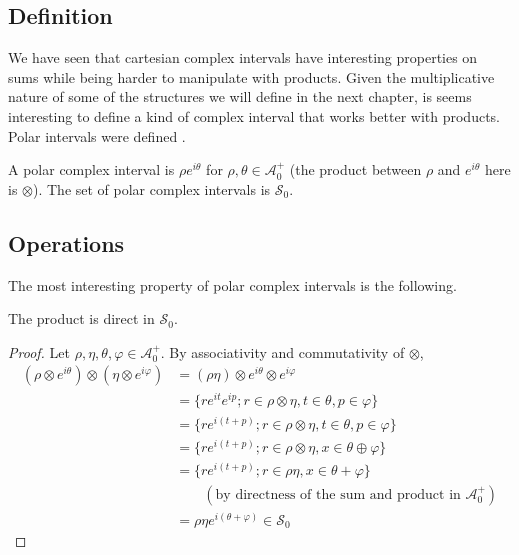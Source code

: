 \subsection{Definition}

We have seen that cartesian complex intervals have interesting properties on sums while being harder to manipulate with products. Given the multiplicative nature of some of the structures we will define in the next chapter, is seems interesting to define a kind of complex interval that works better with products. Polar intervals were defined .

A polar complex interval is $\rho e^{i\theta}$ for $\rho, \theta \in \mathcal{A}_0^+$ (the product between $\rho$ and $e^{i\theta}$ here is $\otimes$). The set of polar complex intervals is $\mathcal{S}_0$.

\subsection{Operations}

The most interesting property of polar complex intervals is the following.

\begin{theorem}
The product is direct in $\mathcal{S}_0$.
\end{theorem}
\begin{proof}
Let $\rho, \eta, \theta, \varphi \in \mathcal{A}_0^+$. By associativity and commutativity of $\otimes$,
\begin{align*}
    (\rho \otimes e^{i\theta}) \otimes (\eta \otimes e^{i\varphi})
    &= (\rho \eta) \otimes e^{i\theta} \otimes e^{i\varphi} \\
    &= \{r e^{it} e^{ip} ; r \in \rho \otimes \eta, t \in \theta, p \in \varphi\} \\
    &= \{r e^{i(t+p)} ; r \in \rho \otimes \eta, t \in \theta, p \in \varphi\} \\
    &= \{r e^{i(t+p)} ; r \in \rho \otimes \eta, x \in \theta \oplus \varphi\} \\
    &= \{r e^{i(t+p)} ; r \in \rho \eta, x \in \theta + \varphi\} \\
    & \quad \quad (\text{by directness of the sum and product in } \mathcal{A}_0^+) \\
    &= \rho \eta e^{i(\theta + \varphi)} \in \mathcal{S}_0
\end{align*}
\end{proof}
